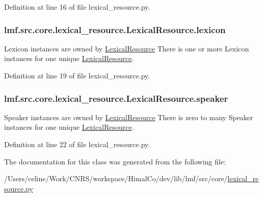Definition at line 16 of file lexical\+\_\+resource.\+py.

\hypertarget{classlmf_1_1src_1_1core_1_1lexical__resource_1_1_lexical_resource_af4146645965f04411b37e8e52e7a04e0}{
\subsubsection[{lexicon}]{\setlength{\rightskip}{0pt plus 5cm}lmf.\+src.\+core.\+lexical\+\_\+resource.\+Lexical\+Resource.\+lexicon}}\label{classlmf_1_1src_1_1core_1_1lexical__resource_1_1_lexical_resource_af4146645965f04411b37e8e52e7a04e0}


Lexicon instances are owned by \hyperlink{classlmf_1_1src_1_1core_1_1lexical__resource_1_1_lexical_resource}{Lexical\+Resource} There is one or more Lexicon instances for one unique \hyperlink{classlmf_1_1src_1_1core_1_1lexical__resource_1_1_lexical_resource}{Lexical\+Resource}. 



Definition at line 19 of file lexical\+\_\+resource.\+py.

\hypertarget{classlmf_1_1src_1_1core_1_1lexical__resource_1_1_lexical_resource_a378c5ca2854f818361547eee196d3497}{
\subsubsection[{speaker}]{\setlength{\rightskip}{0pt plus 5cm}lmf.\+src.\+core.\+lexical\+\_\+resource.\+Lexical\+Resource.\+speaker}}\label{classlmf_1_1src_1_1core_1_1lexical__resource_1_1_lexical_resource_a378c5ca2854f818361547eee196d3497}


Speaker instances are owned by \hyperlink{classlmf_1_1src_1_1core_1_1lexical__resource_1_1_lexical_resource}{Lexical\+Resource} There is zero to many Speaker instances for one unique \hyperlink{classlmf_1_1src_1_1core_1_1lexical__resource_1_1_lexical_resource}{Lexical\+Resource}. 



Definition at line 22 of file lexical\+\_\+resource.\+py.



The documentation for this class was generated from the following file\+:\begin{DoxyCompactItemize}
\item 
/\+Users/celine/\+Work/\+C\+N\+R\+S/workspace/\+Himal\+Co/dev/lib/lmf/src/core/\hyperlink{lexical__resource_8py}{lexical\+\_\+resource.\+py}\end{DoxyCompactItemize}
